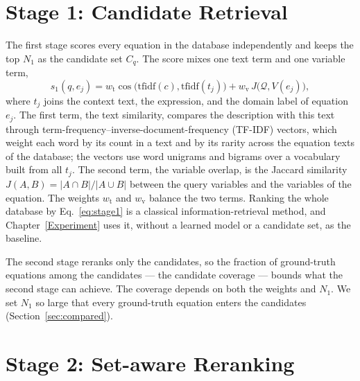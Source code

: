 \section{Stage 1: Candidate Retrieval}
\label{sec:stage1}

The first stage scores every equation in the database independently and keeps the top $N_1$ as
the candidate set $C_q$. The score mixes one text term and one variable term,
\begin{equation}
  s_1(q, e_j) = w_{\mathrm{t}} \cos\!\big(\mathrm{tfidf}(c), \mathrm{tfidf}(t_j)\big)
              + w_{\mathrm{v}} \, J\!\big(\mathcal{Q}, V(e_j)\big) ,
  \label{eq:stage1}
\end{equation}
where $t_j$ joins the context text, the expression, and the domain label of equation $e_j$. The
first term, the text similarity, compares the description with this text through
term-frequency--inverse-document-frequency (TF-IDF) vectors\cite{Salton}, which weight each word
by its count in a text and by its rarity across the equation texts of the database; the vectors
use word unigrams and bigrams over a vocabulary built from all $t_j$. The second term, the
variable overlap, is the Jaccard similarity $J(A, B) = |A \cap B| / |A \cup B|$ between the query
variables and the variables of the equation. The weights $w_{\mathrm{t}}$ and $w_{\mathrm{v}}$
balance the two terms. Ranking the whole database by Eq.~\eqref{eq:stage1} is a classical
information-retrieval method\cite{Manning}, and Chapter~\ref{Experiment} uses it, without a
learned model or a candidate set, as the baseline.

The second stage reranks only the candidates, so the fraction of ground-truth equations among the
candidates --- the candidate coverage --- bounds what the second stage can achieve. The coverage
depends on both the weights and $N_1$. We set $N_1$ so large that every ground-truth equation
enters the candidates (Section~\ref{sec:compared}).

\section{Stage 2: Set-aware Reranking}
\label{sec:stage2}

